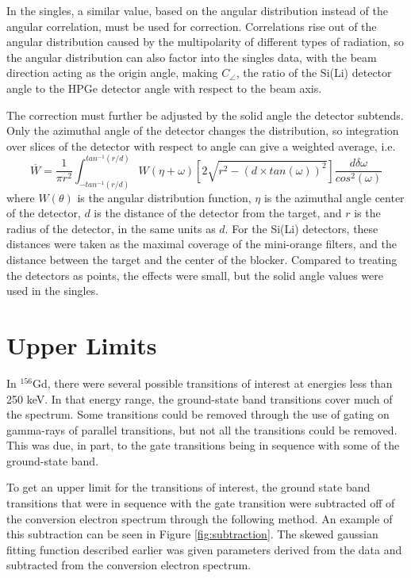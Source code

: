 In the singles, a similar value, based on the angular distribution instead of the angular correlation, must be used for correction. Correlations rise out of the angular distribution caused by the multipolarity of different types of radiation, so the angular distribution can also factor into the singles data, with the beam direction acting as the origin angle, making $C_{\angle}$, the ratio of the Si(Li) detector angle to the HPGe detector angle with respect to the beam axis.

The correction must further be adjusted by the solid angle the detector subtends. Only the azimuthal angle of the detector changes the distribution, so integration over slices of the detector with respect to angle can give a weighted average, i.e.
\begin{equation}
    \overline{W}=\frac{1}{\pi r^2}\int^{tan^{-1}(r/d)}_{-tan^{-1}(r/d)}W(\eta+\omega)\left[2\sqrt{r^2-\left(d\times tan(\omega)\right)^2}\right]\frac{d\delta\omega}{cos^2(\omega)}
\end{equation}
where $W(\theta)$ is the angular distribution function, $\eta$ is the azimuthal angle center of the detector, $d$ is the distance of the detector from the target, and $r$ is the radius of the detector, in the same units as $d$. For the Si(Li) detectors, these distances were taken as the maximal coverage of the mini-orange filters, and the distance between the target and the center of the blocker.  Compared to treating the detectors as points, the effects were small, but the solid angle values were used in the singles.

\section{Upper Limits}
\label{sec:upper_limit}

In $^{156}$Gd, there were several possible transitions of interest at energies less than 250 keV. In that energy range, the ground-state band transitions cover much of the spectrum. Some transitions could be removed through the use of gating on gamma-rays of parallel transitions, but not all the transitions could be removed. This was due, in part, to the gate transitions being in sequence with some of the ground-state band. 

To get an upper limit for the transitions of interest, the ground state band transitions that were in sequence with the gate transition were subtracted off of the conversion electron spectrum through the following method. An example of this subtraction can be seen in Figure \ref{fig:subtraction}. The skewed gaussian fitting function described earlier was given parameters derived from the data and subtracted from the conversion electron spectrum.

